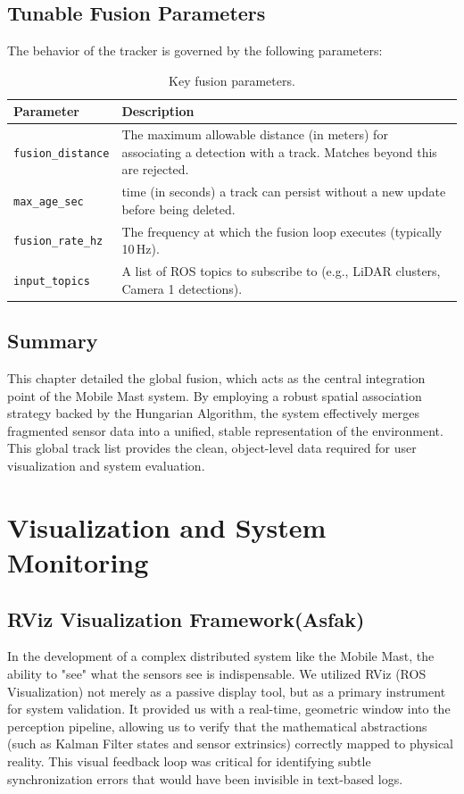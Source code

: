 \documentclass[12pt,a4paper]{report}
\begin{document}
{\section{Tunable Fusion Parameters}
The behavior of the tracker is governed by the following parameters:
\begin{table}[H]
\centering
\caption{Key fusion parameters.}
\label{tab:fusion-params}
\begin{tabularx}{\textwidth}{@{}l X@{}}
\toprule
\textbf{Parameter} & \textbf{Description} \\
\midrule
\texttt{fusion\_distance} & The maximum allowable distance (in meters) for associating a detection with a track. Matches beyond this are rejected. \\
\texttt{max\_age\_sec} & time (in seconds) a track can persist without a new update before being deleted. \\
\texttt{fusion\_rate\_hz} & The frequency at which the fusion loop executes (typically 10\,Hz). \\
\texttt{input\_topics} & A list of ROS topics to subscribe to (e.g., LiDAR clusters, Camera 1 detections). \\
\bottomrule
\end{tabularx}
\end{table}

\section{Summary}
This chapter detailed the global fusion, which acts as the central integration point of the Mobile Mast system. By employing a robust spatial association strategy backed by the Hungarian Algorithm, the system effectively merges fragmented sensor data into a unified, stable representation of the environment. This global track list provides the clean, object-level data required for user visualization and system evaluation.

\chapter{Visualization and System Monitoring}

\section{RViz Visualization Framework(Asfak)}
In the development of a complex distributed system like the Mobile Mast, the ability to "see" what the sensors see is indispensable. We utilized RViz (ROS Visualization) not merely as a passive display tool, but as a primary instrument for system validation. It provided us with a real-time, geometric window into the perception pipeline, allowing us to verify that the mathematical abstractions (such as Kalman Filter states and sensor extrinsics) correctly mapped to physical reality. This visual feedback loop was critical for identifying subtle synchronization errors that would have been invisible in text-based logs.

}
\end{document}
